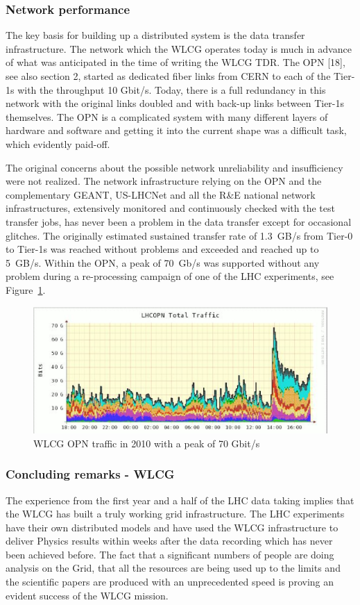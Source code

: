 \documentclass{intech}
\begin{document}
\subsubsection{Network performance}
%
The key basis for building up a distributed system is the data
transfer infrastructure. The network which the WLCG operates today
is much in advance of what was anticipated in the time of writing
the WLCG TDR. The OPN [18], see also section 2, started as dedicated
fiber links from CERN to each of the Tier-1s with the throughput 10
Gbit/s. Today, there is a full redundancy in this network with the
original links doubled and with back-up links between Tier-1s
themselves. The OPN is a complicated system with many different
layers of hardware and software and getting it into the current
shape was a difficult task, which evidently paid-off.

The original concerns about the possible network unreliability and
insufficiency were not realized. The network infrastructure relying
on the OPN and the complementary GEANT, US-LHCNet and all the R\&E
national network infrastructures, extensively monitored and
continuously checked with the test transfer jobs, has never been a
problem in the data transfer except for occasional glitches. The
originally estimated sustained transfer rate of 1.3~GB/s from Tier-0
to Tier-1s was reached without problems and exceeded and reached up
to 5~GB/s. Within the OPN, a peak of 70~Gb/s was supported without
any problem during a re-processing campaign of one of the LHC
experiments, see Figure~\ref{fig20}.

\begin{figure}[htb] %
\centering
\includegraphics[width=13cm]{fig20.eps} %
\caption{WLCG OPN traffic in 2010 with a peak of 70
Gbit/s}\label{fig20}
\end{figure}



\subsubsection{Concluding remarks - WLCG}
%
The experience from the first year and a half of the LHC data taking
implies that the WLCG has built a truly working grid infrastructure.
The LHC experiments have their own distributed models and have used
the WLCG infrastructure to deliver Physics results within weeks
after the data recording which has never been achieved before. The
fact that a significant numbers of people are doing analysis on the
Grid, that all the resources are being used up to the limits and the
scientific papers are produced with an unprecedented speed is
proving an evident success of the WLCG mission.
\end{document}
